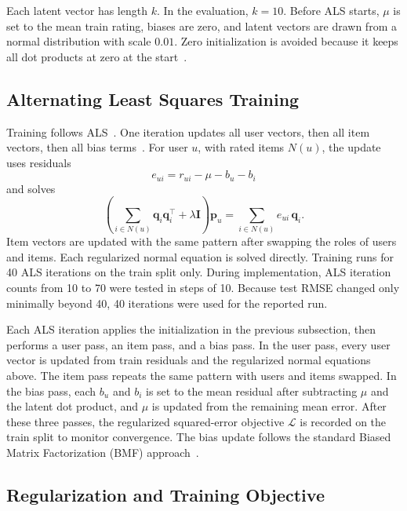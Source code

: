 \documentclass[conference]{IEEEtran}
\begin{document}
Each latent vector has length $k$. In the evaluation, $k = 10$. Before ALS starts, $\mu$ is set to the mean train rating, biases are zero, and latent vectors are drawn from a normal distribution with scale $0.01$. Zero initialization is avoided because it keeps all dot products at zero at the start~\cite{ref1,ref3}.

\subsection{Alternating Least Squares Training}

Training follows ALS~\cite{ref1,ref2}. One iteration updates all user vectors, then all item vectors, then all bias terms~\cite{ref1}. For user $u$, with rated items $N(u)$, the update uses residuals
\begin{equation}
e_{ui} = r_{ui} - \mu - b_u - b_i
\end{equation}
and solves
\begin{equation}
\left( \sum_{i \in N(u)} \mathbf{q}_i \mathbf{q}_i^\top + \lambda \mathbf{I} \right) \mathbf{p}_u = \sum_{i \in N(u)} e_{ui}\, \mathbf{q}_i.
\end{equation}
Item vectors are updated with the same pattern after swapping the roles of users and items. Each regularized normal equation is solved directly. Training runs for 40 ALS iterations on the train split only. During implementation, ALS iteration counts from 10 to 70 were tested in steps of 10. Because test RMSE changed only minimally beyond 40, 40 iterations were used for the reported run.

Each ALS iteration applies the initialization in the previous subsection, then performs a user pass, an item pass, and a bias pass. In the user pass, every user vector is updated from train residuals and the regularized normal equations above. The item pass repeats the same pattern with users and items swapped. In the bias pass, each $b_u$ and $b_i$ is set to the mean residual after subtracting $\mu$ and the latent dot product, and $\mu$ is updated from the remaining mean error. After these three passes, the regularized squared-error objective $\mathcal{L}$ is recorded on the train split to monitor convergence. The bias update follows the standard Biased Matrix Factorization (BMF) approach~\cite{ref1,ref2}.

\subsection{Regularization and Training Objective}
\end{document}
